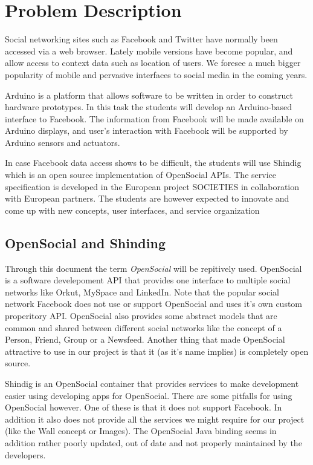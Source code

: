 \section{Problem Description}
Social networking sites such as Facebook and Twitter have normally been accessed  via a web browser. Lately mobile versions have become popular, and allow access to context data such as location of users. We foresee a much bigger popularity of mobile and pervasive interfaces to social media in the coming years. 

Arduino\cite{link:arduino} is a platform that allows software to be written in order to construct hardware 
prototypes. In this task the students will develop an Arduino-based interface to Facebook. The information from 
Facebook will be made available on Arduino displays, and user’s interaction with Facebook will be supported by 
Arduino sensors and actuators.

In case Facebook data access shows to be difficult, the students will use Shindig\cite{link:shinding} which 
is an open source implementation of OpenSocial APIs. The service specification is developed in the European project 
SOCIETIES in collaboration with European partners. The students are however expected to innovate and come up 
with new concepts, user interfaces, and service organization

\subsection{OpenSocial and Shinding}
Through this document the term {\em OpenSocial}\cite{link:opensocial} will be repitively used. OpenSocial is a software develepoment API that provides
one interface to multiple social networks like Orkut, MySpace and LinkedIn. Note that the popular social network Facebook does not use
or support OpenSocial and uses it's own custom properitory API. OpenSocial also provides some abstract models that are common
and shared between different social networks like the concept of a Person, Friend, Group or a Newsfeed. Another thing that
made OpenSocial attractive to use in our project is that it (as it's name implies) is completely open source.

Shindig is an OpenSocial container that provides services to make development easier using developing apps for OpenSocial. There are some pitfalls
for using OpenSocial however. One of these is that it does not support Facebook. In addition it also does not provide all the services we might require
for our project (like the Wall concept or Images). The OpenSocial Java binding seems in addition rather poorly updated, out of date and not properly
maintained by the developers.

